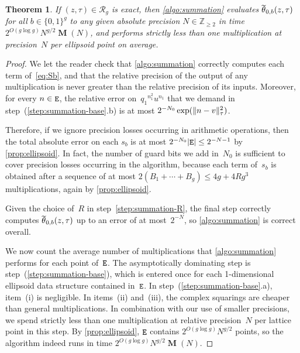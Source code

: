 \documentclass[12pt,oneside]{amsart}
\numberwithin{equation}{section}
\newtheorem{thm}[equation]{Theorem}
\theoremstyle{definition}
\newcommand{\Z}{\mathbb{Z}}
\newcommand{\red}{\mathcal{R}}
\DeclareMathOperator{\E}{\tt E}
\DeclareMathOperator{\thetatilde}{\rlap{\raisebox{-0.1ex}{$\widetilde{\phantom{\,t}}$}}\theta}
\DeclareMathOperator{\Mul}{\mathbf{M}}
\DeclarePairedDelimiter{\abs}{|}{|}
\DeclarePairedDelimiter{\norm}{\|}{\|}
\begin{document}
\begin{thm}
  \label{thm:unif-summation}
  If $(z,\tau)\in \red_g$ is exact, then
  \cref{algo:summation} evaluates $\thetatilde_{0,b}(z,\tau)$ for all
  $b\in\{0,1\}^g$ to any given absolute precision $N\in \Z_{\geq 2}$ in time
  $2^{O(g\log g)} N^{g/2}\Mul(N)$, and performs strictly less than one
  multiplication at precision~$N$ per ellipsoid point on average.
\end{thm}

\begin{proof}
  We let the reader check that \cref{algo:summation} correctly computes each
  term of~\eqref{eq:Sb}, and that the relative precision of the output of any
  multiplication is never greater than the relative precision of its
  inputs. Moreover, for every $n\in \E$, the relative error
  on~${q_1}^{n_1^2} u^{n_1}$ that we demand in
  step~(\ref{step:summation-base}.b) is at most
  $2^{-N_0}\exp(\norm{n-v}_\tau^2)$.

  Therefore, if we ignore precision losses occurring in arithmetic operations,
  then the total absolute error on each $s_b$ is at most
  $2^{-N_0} \abs{\E} \leq 2^{-N-1}$ by \cref{prop:ellipsoid}. In fact, the
  number of guard bits we add in~$N_0$ is sufficient to cover precision losses
  occurring in the algorithm, because each term of~$s_b$ is obtained after a
  sequence of at most $2(B_1 + \cdots + B_g)\leq 4g + 4Rg^3$ multiplications,
  again by \cref{prop:ellipsoid}.

  Given the choice of~$R$ in step~\eqref{step:summation-R}, the final step
  correctly computes $\thetatilde_{0,b}(z,\tau)$ up to an error of at
  most~$2^{-N}$, so \cref{algo:summation} is correct overall.

  We now count the average number of multiplications that \cref{algo:summation}
  performs for each point of~$\E$. The asymptotically dominating step is
  step~(\ref{step:summation-base}), which is entered once for each
  1-dimensional ellipsoid data structure contained in~$\E$. In
  step~(\ref{step:summation-base}.a), item~(i) is negligible. In items~(ii)
  and~(iii), the complex squarings are cheaper than general multiplications. In
  combination with our use of smaller precisions, we spend strictly less than
  one multiplication at relative precision~$N$ per lattice point in this
  step. By \cref{prop:ellipsoid}, $\E$ contains $2^{O(g \log g)} N^{g/2}$
  points, so the algorithm indeed runs in time
  $ 2^{O(g \log g)} N^{g/2} \Mul(N)$.
\end{proof}
\end{document}
